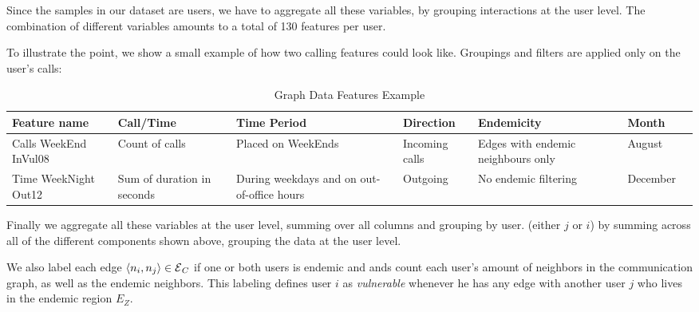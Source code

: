 
Since the samples in our dataset are users, we have to aggregate all these variables, by grouping interactions at the user level. The combination of different variables amounts to a total of 130 features per user.

To illustrate the point, we show a small example of how two calling features could look like. Groupings and filters are applied only on the user's calls:

\begin{table}[ht]
	\caption{Graph Data Features Example}
	\label{tab:data_example}
	\centering
	\begin{tabular} {|p{1.5cm}|p{1.5cm}|p{2cm}|p{1.5cm}|p{2cm}|p{1.5cm}|p{1cm}}
		\toprule
		Feature name & Call/Time & Time Period & Direction & Endemicity & Month\\
		\midrule
		Calls WeekEnd InVul08     & Count of calls & Placed on WeekEnds & Incoming calls & Edges with endemic neighbours only & August\\
		\midrule
		Time WeekNight Out12 & Sum of duration in seconds & During weekdays and on out-of-office hours & Outgoing  & No endemic filtering  & December \\
		
		\bottomrule
	\end{tabular}
\end{table}



Finally we aggregate all these variables at the user level, summing over all columns and grouping by user. 
(either $j$ or $i$) by summing across all of the different components shown above, grouping the data at the user level.

We also label each edge $\left< n_i, n_j \right> \in \operatorname{\mathcal{E}}_C$ if one or both users is endemic and
ands count each user's amount of neighbors in the communication graph, as well as the endemic neighbors. This labeling defines user $i$ as \textit{vulnerable} whenever he has any edge with another user $j$ who lives in the endemic region $E_Z$. 


